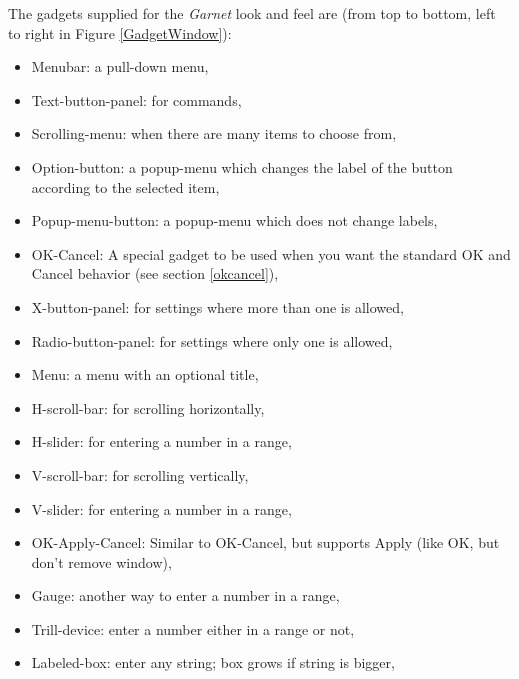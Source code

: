 The gadgets supplied for the {\it Garnet} look and feel are (from top to
bottom, left to right in Figure \ref{GadgetWindow}):
\begin{itemize}
\item Menubar: a pull-down menu,

\item Text-button-panel: for commands,

\item Scrolling-menu: when there are many items to choose from,

\item Option-button: a popup-menu which changes the label of the button according to
the selected item,

\item Popup-menu-button: a popup-menu which does not change labels,

\item OK-Cancel: A special gadget to be used when you want the standard OK and
Cancel behavior (see section \ref{okcancel}),

\item X-button-panel: for settings where more than one is allowed,

\item Radio-button-panel: for settings where only one is allowed,

\item Menu: a menu with an optional title,

\item H-scroll-bar: for scrolling horizontally,

\item H-slider: for entering a number in a range,

\item V-scroll-bar: for scrolling vertically,

\item V-slider: for entering a number in a range,

\item OK-Apply-Cancel: Similar to OK-Cancel, but supports Apply (like OK,
but don't remove window),

\item Gauge: another way to enter a number in a range,

\item Trill-device: enter a number either in a range or not,

\item Labeled-box: enter any string; box grows if string is bigger,


\end{itemize}
